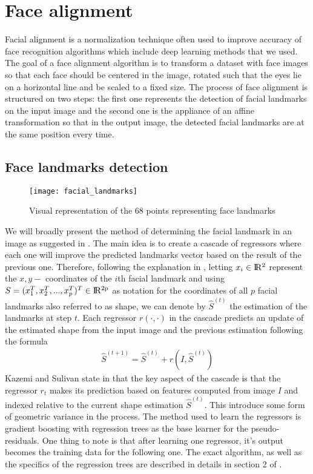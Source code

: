 \section{Face alignment}
Facial alignment is a normalization technique often used to improve accuracy of face recognition algorithms which include deep learning methods that we used. The goal of a face alignment algorithm is to transform a dataset with face images so that each face should be centered in the image, rotated such that the eyes lie on a horizontal line and be scaled to a fixed size.
The process of face alignment is structured on two steps: the first one represents the detection of facial landmarks on the input image and the second one is the appliance of an affine transformation so that in the output image, the detected facial landmarks are at the same position every time.
\subsection{Face landmarks detection}
\begin{figure}[h]
	\begin{center}
		\texttt{[image: facial\_landmarks]}
		\caption[Facial landmarks visualisation]{Visual representation of the 68 points representing face landmarks}
	\end{center}
\end{figure}
We will broadly present the method of determining the facial landmark in an image as suggested in \cite{kazemi2014one}. The main idea is to create a cascade of regressors where each one will improve the predicted landmarks vector based on the result of the previous one. Therefore, following the explanation in \cite{kazemi2014one}, letting $x_{i} \in \rm I\!R^{2}$ represent the $x,y - $ coordinates of the $i$th facial landmark and using $S = (x_{1}^{T}, x_{2}^{T}, ..., x_{p}^{T})^{T} \in \rm I\!R^{2p}$ as notation for the coordinates of all $p$ facial landmarks also referred to as shape, we can denote by $\hat{S}^{(t)}$ the estimation of the landmarks at step $t$. Each regressor $r(\cdot, \cdot)$ in the cascade predicts an update of the estimated shape from the input image and the previous estimation following the formula
\begin{align}
	\hat{S}^{(t+1)} = \hat{S}^{(t)} + r(I, \hat{S}^{(t)})
\end{align}
Kazemi and Sulivan state in \cite{kazemi2014one} that the key aspect of the cascade is that the regressor $r_{t}$ makes its prediction based on features computed from image $I$ and indexed relative to the current shape estimation $\hat{S}^{(t)}$. This introduce some form of geometric variance in the process. The method used to learn the regressors is gradient boosting with regression trees as the base learner for the pseudo-residuals. One thing to note is that after learning one regressor, it's output becomes the training data for the following one. The exact algorithm, as well as the specifics of the regression trees are described in details in section 2 of \cite{kazemi2014one}.

